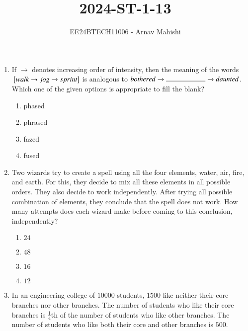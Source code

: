 \documentclass[journal]{IEEEtran}
\begin{document}

\vspace{3cm}

\title{2024-ST-1-13}
\author{EE24BTECH11006 - Arnav Mahishi}
{\let\newpage\relax\maketitle}
\begin{enumerate}
\item{
 If $\rightarrow$ denotes increasing order of intensity, then the meaning of the words ${}\left[walk\rightarrow jog\rightarrow sprint\right]$ is analogous to $bothered\rightarrow\rule{2cm}{0.15mm}\rightarrow daunted$. Which one of the given options is appropriate to fill the blank?
\begin{multicols}{4}
\begin{enumerate}
\item phased
\item phrased
\item fazed
\item fused
\end{enumerate}
\end{multicols}
}
\item{
Two wizards try to create a spell using all the four elements, water, air, fire, and earth. For this, they decide to mix all these elements in all possible orders. They also decide to work independently. After trying all possible combination of elements, they conclude that the spell does not work.
How many attempts does each wizard make before coming to this conclusion, independently?
\begin{multicols}{4}
\begin{enumerate}
\item $24$ 
\item $48$ 
\item $16$
\item $12$
\end{enumerate}
\end{multicols}}
\item{
In an engineering college of $10000$ students, $1500$ like neither their core branches nor other branches. The number of students who like their core branches is $\frac{1}{4}$th of the number of students who like other branches. The number of students who like both their core and other branches is $500$.
}
\end{enumerate}
\end{document}
